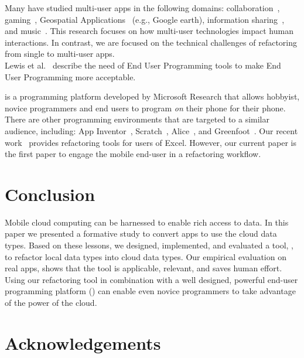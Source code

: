 \documentclass[article]{sigplanconf}
\begin{document}
Many have studied multi-user apps in the following domains: collaboration~\cite{Yuill:multiuserColab, Lopez-Gulliver:imageprocessing}, gaming~\cite{Leichtenstern:multiuserGames}, Geospatial Applications~\cite{Forlines:geospatial} (e.g., Google earth), information sharing~\cite{Nacenta:2012:LMM:2307798.2307816}, and music~\cite{Sorensen:2012:ISM:2399016.2399094}. This research focuses on how multi-user technologies impact human interactions. In contrast, we are focused on the technical challenges of refactoring from single to multi-user apps. \\

Lewis et al.~\cite{lewis2009report} describe the need of End User Programming tools to make End User Programming more acceptable.  

\TD is a programming platform developed by Microsoft Research that allows hobbyist, novice programmers and end users  to program \emph{on} their phone for their phone.  There are other programming environments that are targeted to a similar audience, including:  App Inventor~\cite{Wolber}, Scratch~\cite{maloney2010scratch}, Alice~\cite{cooper2010design}, and Greenfoot~\cite{kolling2010greenfoot}. 
Our recent work~\cite{badame2012refactoring} provides refactoring tools for users of Excel. 
However, our current paper is the first paper to engage the mobile end-user in a refactoring workflow.


\section{Conclusion}
\label{sec:conclusions}
Mobile cloud computing can be harnessed to enable rich access to data. 
In this paper we presented a formative study to convert \numFormative apps to use the \TD cloud data types. 
Based on these lessons, we designed, implemented, and evaluated a tool,  \tool,  to refactor local data types into cloud data types.  
Our empirical evaluation on \numScripts real apps, shows that the tool is applicable, relevant, and saves human effort.
Using our refactoring tool in combination with a well designed, powerful end-user programming platform (\TD) can enable even novice programmers to take advantage of the power of the cloud.


\section{Acknowledgements}






\end{document}
